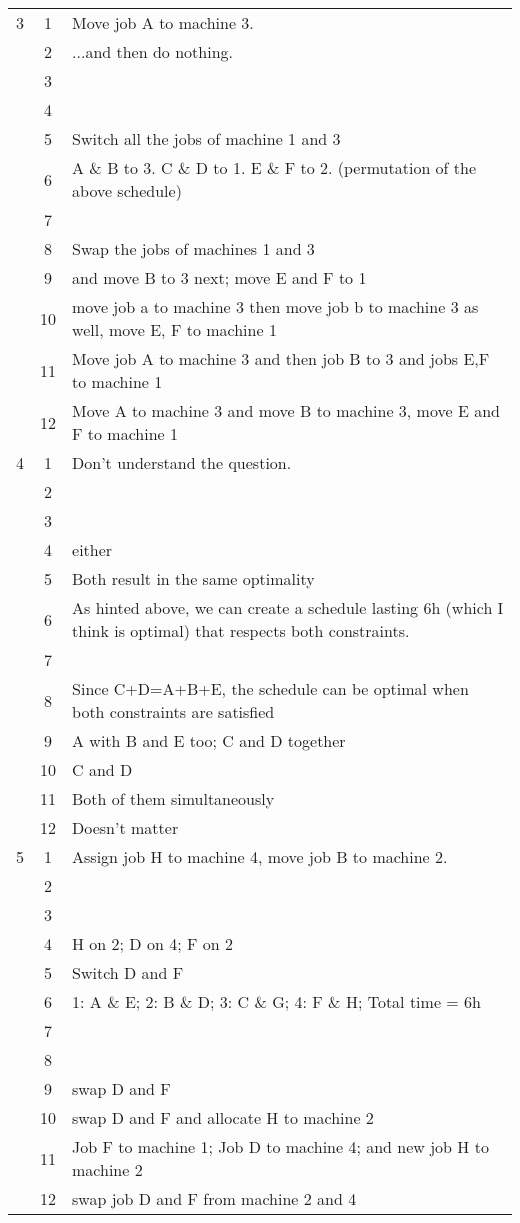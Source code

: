 \begin{tabularx}{\linewidth}{c c X}
	\hline
	3 & 1 & Move job A to machine 3. \\
	& 2 & ...and then do nothing. \\
	& 3 &  \\
	& 4 &  \\
	& 5 & Switch all the jobs of machine 1 and 3 \\
	& 6 & A \& B to 3. C \& D to 1. E \& F to 2. (permutation of the above schedule) \\
	& 7 &  \\
	& 8 & Swap the jobs of machines 1 and 3 \\
	& 9 & and move B to 3 next; move E and F to 1 \\
	& 10 & move job a to machine 3 then move job b to machine 3 as well, move E, F to machine 1 \\
	& 11 & Move job A to machine 3 and then job B to 3 and jobs E,F to machine 1 \\
	& 12 & Move A to machine 3 and move B to machine 3, move E and F to machine 1 \\
	\hline
	4 & 1 & Don't understand the question. \\
	& 2 &  \\
	& 3 &  \\
	& 4 & either \\
	& 5 & Both result in the same optimality \\
	& 6 & As hinted above, we can create a schedule lasting 6h (which I think is optimal) that respects both constraints. \\
	& 7 &  \\
	& 8 & Since C+D=A+B+E, the schedule can be optimal when both constraints are satisfied \\
	& 9 & A with B and E too; C and D together \\
	& 10 & C and D \\
	& 11 & Both of them simultaneously \\
	& 12 & Doesn't matter \\
	\hline
	5 & 1 & Assign job H to machine 4, move job B to machine 2. \\
	& 2 &  \\
	& 3 &  \\
	& 4 & H on 2; D on 4; F on 2 \\
	& 5 & Switch D and F \\
	& 6 & 1: A \& E; 2: B \& D; 3: C \& G; 4: F \& H; Total time = 6h \\
	& 7 &  \\
	& 8 &  \\
	& 9 & swap D and F \\
	& 10 & swap D and F and allocate H to machine 2 \\
	& 11 & Job F to machine 1; Job D to machine 4; and new job H to machine 2 \\
	& 12 & swap job D and F from machine 2 and 4 \\
	\hline
\end{tabularx}

